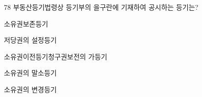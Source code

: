 \begin{question}{78}
부동산등기법령상 등기부의 을구란에 기재하여 공시하는 등기는?
\begin{choices}
  \item 소유권보존등기
  \item 저당권의 설정등기
  \item 소유권이전등기청구권보전의 가등기
  \item 소유권의 말소등기
  \item 소유권의 변경등기
\end{choices}
\end{question}
